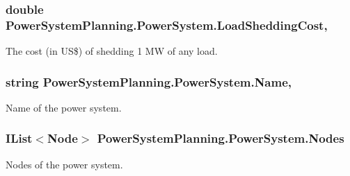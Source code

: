 \subsubsection[{\texorpdfstring{Load\+Shedding\+Cost}{LoadSheddingCost}}]{\setlength{\rightskip}{0pt plus 5cm}double Power\+System\+Planning.\+Power\+System.\+Load\+Shedding\+Cost\hspace{0.3cm}{\ttfamily [get]}, {\ttfamily [set]}}\hypertarget{class_power_system_planning_1_1_power_system_a3f0729d4eaa155e4b8be848d84a1fbff}{}\label{class_power_system_planning_1_1_power_system_a3f0729d4eaa155e4b8be848d84a1fbff}


The cost (in US\$) of shedding 1 MW of any load. 

\subsubsection[{\texorpdfstring{Name}{Name}}]{\setlength{\rightskip}{0pt plus 5cm}string Power\+System\+Planning.\+Power\+System.\+Name\hspace{0.3cm}{\ttfamily [get]}, {\ttfamily [set]}}\hypertarget{class_power_system_planning_1_1_power_system_ae511d3a9d7c871726037041b9fdabe14}{}\label{class_power_system_planning_1_1_power_system_ae511d3a9d7c871726037041b9fdabe14}


Name of the power system. 

\subsubsection[{\texorpdfstring{Nodes}{Nodes}}]{\setlength{\rightskip}{0pt plus 5cm}I\+List$<${\bf Node}$>$ Power\+System\+Planning.\+Power\+System.\+Nodes\hspace{0.3cm}{\ttfamily [get]}}\hypertarget{class_power_system_planning_1_1_power_system_aa51d9c68a12cae03acd530e9ceff58f9}{}\label{class_power_system_planning_1_1_power_system_aa51d9c68a12cae03acd530e9ceff58f9}


Nodes of the power system. 

